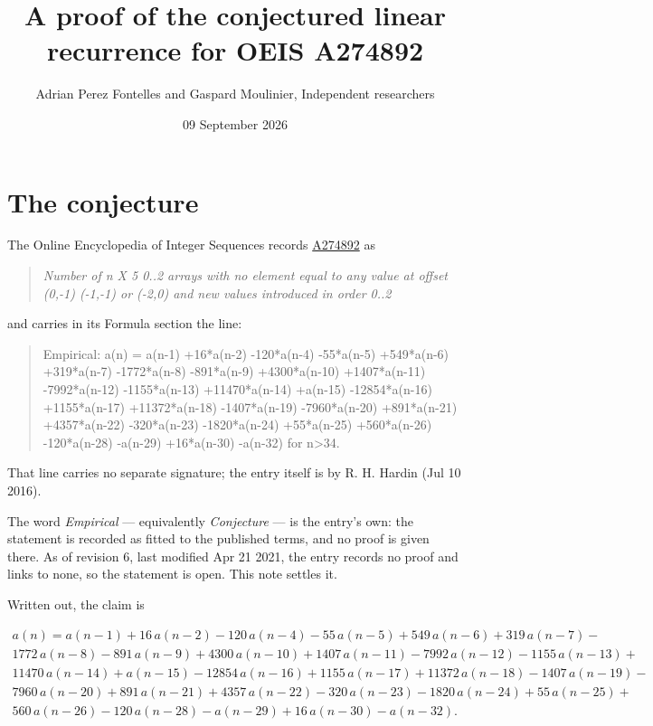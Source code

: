 \documentclass[11pt]{article}
\title{A proof of the conjectured linear recurrence for OEIS A274892}
\author{Adrian Perez Fontelles and Gaspard Moulinier, Independent researchers}
\date{09 September 2026}
\theoremstyle{definition}
\begin{document}
\maketitle
\section{The conjecture}

The Online Encyclopedia of Integer Sequences records \href{https://oeis.org/A274892}{A274892} as

\begin{quote}\itshape Number of n X 5 0..2 arrays with no element equal to any value at offset (0,-1) (-1,-1) or (-2,0) and new values introduced in order 0..2\end{quote}

and carries in its Formula section the line:

\begin{quote}\ttfamily Empirical: a(n) = a(n-1) +16*a(n-2) -120*a(n-4) -55*a(n-5) +549*a(n-6) +319*a(n-7) -1772*a(n-8) -891*a(n-9) +4300*a(n-10) +1407*a(n-11) -7992*a(n-12) -1155*a(n-13) +11470*a(n-14) +a(n-15) -12854*a(n-16) +1155*a(n-17) +11372*a(n-18) -1407*a(n-19) -7960*a(n-20) +891*a(n-21) +4357*a(n-22) -320*a(n-23) -1820*a(n-24) +55*a(n-25) +560*a(n-26) -120*a(n-28) -a(n-29) +16*a(n-30) -a(n-32) for n>34.\end{quote}

That line carries no separate signature; the entry itself is by R. H. Hardin (Jul 10 2016).

The word {\itshape Empirical} --- equivalently {\itshape Conjecture} --- is the entry's own: the statement is recorded as fitted to the published terms, and no proof is given there. As of revision 6, last modified Apr 21 2021, the entry records no proof and links to none, so the statement is open. This note settles it.

Written out, the claim is

\begin{multline*} a(n) = a(n-1) + 16\,a(n-2) - 120\,a(n-4) - 55\,a(n-5) + 549\,a(n-6) + 319\,a(n-7) - \\ 1772\,a(n-8) - 891\,a(n-9) + 4300\,a(n-10) + 1407\,a(n-11) - 7992\,a(n-12) - 1155\,a(n-13) + \\ 11470\,a(n-14) + a(n-15) - 12854\,a(n-16) + 1155\,a(n-17) + 11372\,a(n-18) - 1407\,a(n-19) - \\ 7960\,a(n-20) + 891\,a(n-21) + 4357\,a(n-22) - 320\,a(n-23) - 1820\,a(n-24) + 55\,a(n-25) + \\ 560\,a(n-26) - 120\,a(n-28) - a(n-29) + 16\,a(n-30) - a(n-32). \end{multline*}
\end{document}
